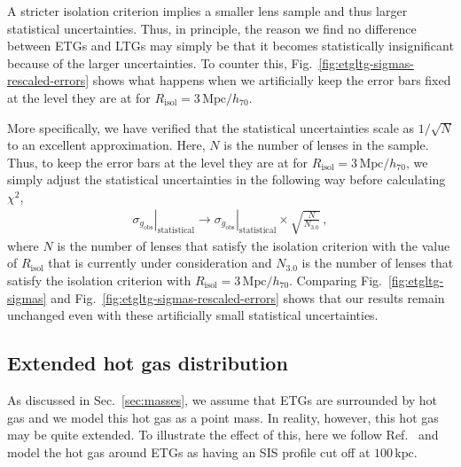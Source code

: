 \documentclass[a4paper,11pt]{article}
\begin{document}
A stricter isolation criterion implies a smaller lens sample and thus larger statistical uncertainties.
Thus, in principle, the reason we find no difference between ETGs and LTGs may simply be that it becomes statistically insignificant because of the larger uncertainties.
To counter this, Fig.~\ref{fig:etgltg-sigmas-rescaled-errors} shows what happens when we artificially keep the error bars fixed at the level they are at for $R_{\mathrm{isol}} = 3\,\mathrm{Mpc}/h_{70}$.

More specifically, we have verified that the statistical uncertainties scale  as $1/\sqrt{N}$ to an excellent approximation.
Here, $N$ is the number of lenses in  the sample.
Thus, to keep the error bars at the level they are at for $R_{\mathrm{isol}} = 3\,\mathrm{Mpc}/h_{70}$, we simply adjust the statistical uncertainties in the following way before calculating $\chi^2$,
\begin{align}
 \label{eq:sigma_sqrtN_rescale}
 \left.\sigma_{g_{\mathrm{obs}}}\right|_{\mathrm{statistical}} \to
 \left.\sigma_{g_{\mathrm{obs}}}\right|_{\mathrm{statistical}} \times \sqrt{\frac{N}{N_{3.0}}} \,,
\end{align}
where $N$ is the number of lenses that satisfy the isolation criterion with the value of $R_{\mathrm{isol}}$ that is currently under consideration and $N_{3.0}$ is the number of lenses that satisfy the isolation criterion with $R_{\mathrm{isol}} = 3\,\mathrm{Mpc}/h_{70}$.
Comparing Fig.~\ref{fig:etgltg-sigmas} and Fig.~\ref{fig:etgltg-sigmas-rescaled-errors} shows that our results remain unchanged even with these artificially small statistical uncertainties.

\subsection{Extended hot gas distribution}
\label{sec:appendix:SIShotgas}

As discussed in Sec.~\ref{sec:masses}, we assume that ETGs are surrounded by hot gas and we model this hot gas as a point mass.
In reality, however, this hot gas may be quite extended.
To illustrate the effect of this, here we follow Ref.~\cite{Brouwer2021} and model the hot gas around ETGs as having an SIS profile cut off at $100\,\mathrm{kpc}$.
\end{document}
